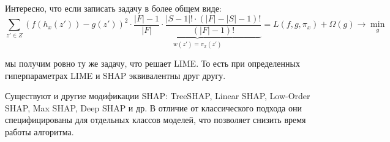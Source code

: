 Интересно, что если записать задачу в более общем виде:
\[
\sum\limits_{z' \in Z} (f(h_x(z')) - g(z'))^2 \cdot \underbrace{\frac{|F|-1}{|F|} \cdot \frac{|S - 1|! \cdot (|F|-|S|-1)!}{(|F|-1)!}}_{w(z') = \pi_x(z')} = L(f, g, \pi_x) + \Omega(g) \rightarrow \min_g
\]

мы получим ровно ту же задачу, что решает LIME. То есть при определенных гиперпараметрах LIME и SHAP эквивалентны друг другу.

Существуют и другие модификации SHAP: TreeSHAP, Linear SHAP, Low-Order SHAP, Max SHAP, Deep SHAP и др. В отличие от классического подхода они специфицированы для отдельных классов моделей, что позволяет снизить время работы алгоритма.


